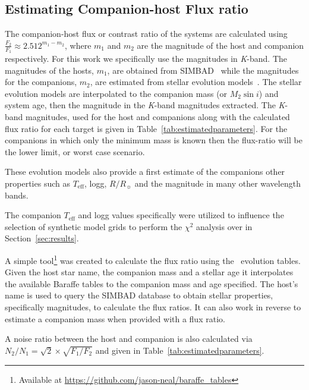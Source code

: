 \documentclass[fleqn,usenatbib]{mnras}
\begin{document}
    \subsection{Estimating Companion-host Flux ratio}
    \label{compaion flux ration}
    The companion-host flux or contrast ratio of the systems are calculated using \( \frac{F_{2}}{F_{1}} \approx 2.512^{m_{1}-m_{2}} \), where \(m_{1} \) and \(m_{2} \) are the magnitude of the host and companion respectively. For this work we specifically use the magnitudes in \textit{K}-band. The magnitudes of the hosts, \(m_{1} \), are obtained from SIMBAD~\citep{wenger_simbad_2000} while the magnitudes for the companions, \(m_{2} \), are estimated from stellar evolution models~\citet{baraffe_evolutionary_2003, baraffe_new_2015}. The stellar evolution models are interpolated to the companion mass  (or \(M_{2}\sin{i}\)) and system age, then the magnitude in the \textit{K}-band magnitudes extracted. The \textit{K}-band magnitudes, used for the host and companions along with the calculated flux ratio for each target is given in Table~\ref{tab:estimatedparameters}. For the companions in which only the minimum mass is known then the flux-ratio will be the lower limit, or worst case scenario.
    
    These evolution models also provide a first estimate of the companions other properties such as \(T_{\textrm{eff}}\), logg, \(R/R_{\sun}\) and the magnitude in many other wavelength bands.
    
    The companion \(T_{\textrm{eff}}\) and logg values specifically were utilized to influence the selection of synthetic model grids to perform the \(\chi^2\) analysis over in Section~\ref{sec:results}.
    
    A simple tool\footnote{Available at \url{https://github.com/jason-neal/baraffe_tables}} was created to calculate the flux ratio using the~\citep{baraffe_evolutionary_2003,baraffe_new_2015} evolution tables. Given the host star name, the companion mass and a stellar age it interpolates the available Baraffe tables to the companion mass and age specified. The host's name is used to query the SIMBAD database to obtain stellar properties, specifically magnitudes, to calculate the flux ratios. It can also work in reverse to estimate a companion mass when provided with a flux ratio.

   A noise ratio between the host and companion is also calculated via \(N_{2}/N_{1} = \sqrt{2} \times\sqrt{F_{1}/F_{2}}\) and given in Table~\ref{tab:estimatedparameters}. 
   


\bsp{}	%
\label{lastpage}
\end{document}
